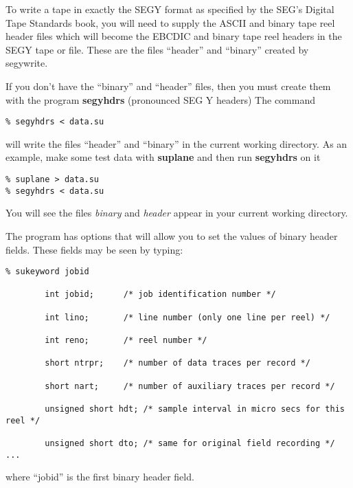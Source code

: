 {{{To write a tape in exactly the SEGY format as specified by the
SEG's Digital Tape Standards book, you will need to supply
the ASCII and binary tape reel header files which will become
the EBCDIC and binary tape reel headers in the SEGY tape or file.
These are the files ``header'' and ``binary'' created by segywrite. 

If you don't have the ``binary'' and ``header'' files, then you
must create them with the program {\bf segyhdrs\/} (pronounced SEG Y headers)
The command
{\small\begin{verbatim}
% segyhdrs < data.su
\end{verbatim}}\noindent
will write the files  ``header'' and ``binary'' in the current working
directory.
As an example, make some test data with {\bf suplane\/} and then
run {\bf segyhdrs\/} on it
{\small\begin{verbatim}
% suplane > data.su
% segyhdrs < data.su
\end{verbatim}}\noindent
You will see the files {\em binary\/} and {\em header\/} appear in
your current working directory.

The program has options that will allow you to set the
values of binary header fields. 
These fields may be seen by typing:
{\small\begin{verbatim}
% sukeyword jobid

        int jobid;      /* job identification number */

        int lino;       /* line number (only one line per reel) */

        int reno;       /* reel number */

        short ntrpr;    /* number of data traces per record */

        short nart;     /* number of auxiliary traces per record */

        unsigned short hdt; /* sample interval in micro secs for this reel */

        unsigned short dto; /* same for original field recording */   
...
\end{verbatim}}\noindent
where ``jobid'' is the first binary header field.

}}}

